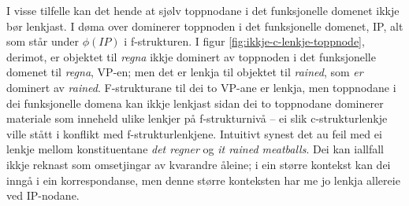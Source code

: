 \documentclass[12pt,a4paper,oneside,draft]{report}
\begin{document}
I visse tilfelle kan det hende at sjølv toppnodane i det funksjonelle
 domenet ikkje bør lenkjast. I døma over dominerer toppnoden i det
 funksjonelle domenet, IP, alt som står under $\phi(IP)$ i
 f\hyp{}strukturen.  I figur \ref{fig:ikkje-c-lenkje-toppnode},
 derimot, er objektet til \emph{regna} ikkje dominert av toppnoden i det
 funksjonelle domenet til \emph{regna}, VP-en; men det er lenkja til
 objektet til \emph{rained}, som \emph{er} dominert av
 \emph{rained}. F\hyp{}strukturane til dei to VP-ane er lenkja, men
 toppnodane i dei funksjonelle domena kan ikkje lenkjast sidan dei to
 toppnodane dominerer materiale som inneheld ulike lenkjer på
 f\hyp{}strukturnivå -- ei slik c\hyp{}strukturlenkje ville stått i
 konflikt med f\hyp{}strukturlenkjene. Intuitivt synest det au feil
 med ei lenkje mellom konstituentane \emph{det regner} og \emph{it rained  meatballs}. Dei kan iallfall ikkje reknast som omsetjingar av
 kvarandre åleine; i ein større kontekst kan dei inngå i ein
 korrespondanse, men denne større konteksten har me jo lenkja allereie
 ved IP-nodane.
\end{document}
